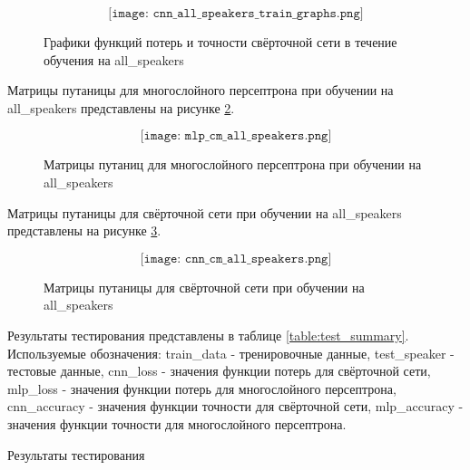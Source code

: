 \begin{figure}[H]
	\[\texttt{[image: cnn\_all\_speakers\_train\_graphs.png]}\]
	\caption{Графики функций потерь и точности свёрточной сети в течение обучения на all\_speakers}
	\label{fig:cnn_all_speakers_train_graphs}
\end{figure}

\newpage
Матрицы путаницы для многослойного персептрона при обучении на all\_speakers представлены на рисунке \ref{fig:mlp_cm_all_speakers}.

\begin{figure}[H]
	\[\texttt{[image: mlp\_cm\_all\_speakers.png]}\]
	\caption{Матрицы путаниц для многослойного персептрона при обучении на all\_speakers}
	\label{fig:mlp_cm_all_speakers}
\end{figure}

\newpage
Матрицы путаницы для свёрточной сети при обучении на all\_speakers представлены на рисунке \ref{fig:cnn_cm_all_speakers}.

\begin{figure}[H]
	\[\texttt{[image: cnn\_cm\_all\_speakers.png]}\]
	\caption{Матрицы путаницы для свёрточной сети при обучении на all\_speakers}
	\label{fig:cnn_cm_all_speakers}
\end{figure}

\newpage
Результаты тестирования представлены в таблице \ref{table:test_summary}. Используемые обозначения: train\_data - тренировочные данные, test\_speaker - тестовые данные, cnn\_loss - значения функции потерь для свёрточной сети, mlp\_loss - значения функции потерь для многослойного персептрона, cnn\_accuracy - значения функции точности для свёрточной сети, mlp\_accuracy - значения функции точности для многослойного персептрона.

\begin{table}[H]
\small
\centering
{}
\caption{Результаты тестирования}
\label{table:test_summary}
\end{table}